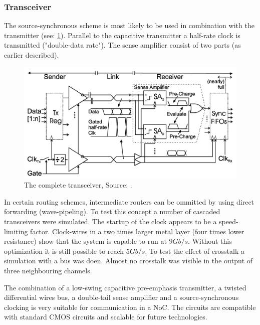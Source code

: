 

\subsubsection{Transceiver} \label{sss:rep2:transceiver}
The source-synchronous scheme is most likely to be used in combination with the transmitter (see: \cref{fig:rep2:transceiver}).
Parallel to the capacitive transmitter a half-rate clock is transmitted ("double-data rate").
The sense amplifier consist of two parts (as earlier described).


\begin{figure}[]
	\centering
	\includegraphics[width=0.9\linewidth]{Figures/Rep2Transceiver.png}
	\caption{The complete transceiver, Source: \cite{schinkel2009low}.} 
    \label{fig:rep2:transceiver}
\end{figure}


In certain routing schemes, intermediate routers can be ommitted by using direct forwarding (wave-pipeling).
To test this concept a number of cascaded transceivers were simulated.
The startup of the clock appears to be a speed-limiting factor.
Clock-wires in a two times larger metal layer (four times lower resistance) show that the system is capable to run at $9 Gb/s$.
Without this optimization it is still possible to reach $5 Gb/s$.
To test the effect of crosstalk a simulation with a bus was doen.
Almost no crosstalk was visible in the output of three neighbouring channels.

The combination of a low-swing capacitive pre-emphasis transmitter, a twisted differential wires bus, a double-tail sense amplifier and a source-synchronous clocking is very suitable for communication in a NoC.
The circuits are compatible with standard CMOS circuits and scalable for future technologies.